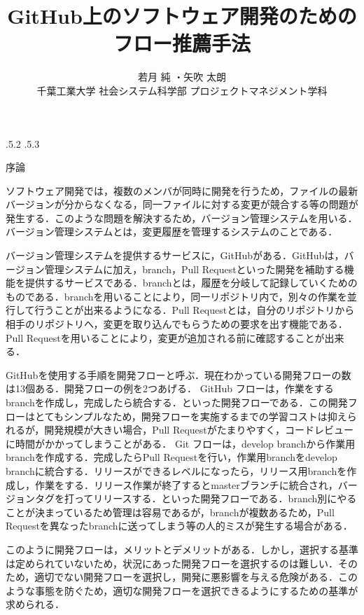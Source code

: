 \documentclass[uplatex,twocolumn]{jsarticle}
\title{\vspace{-14mm}GitHub上のソフトウェア開発のためのフロー推薦手法 \footnotemark[0]}
\author{若月 純 \footnotemark[2]・矢吹 太朗 \\ 千葉工業大学 社会システム科学部 プロジェクトマネジメント学科\footnotemark[2]}
\date{}%
\makeatletter
\renewcommand{\section}{%
    \if@slide\clearpage\fi
    \@startsection{section}{1}{\z@}%
    {\Cvs \@plus.5\Cdp \@minus.2\Cdp}%
    {.5\Cvs \@plus.3\Cdp}%
    {\normalfont\raggedright}}
\makeatother
\begin{document}
\twocolumn[
	\maketitle
]
\begingroup
\def\thefootnote{\fnsymbol{footnote}}
\endgroup

\section{序論}

ソフトウェア開発では，複数のメンバが同時に開発を行うため，ファイルの最新バージョンが分からなくなる，同一ファイルに対する変更が競合する等の問題が発生する．このような問題を解決するため，バージョン管理システムを用いる．バージョン管理システムとは，変更履歴を管理するシステムのことである\cite{ikeda2014}．

バージョン管理システムを提供するサービスに，GitHubがある．GitHubは，バージョン管理システムに加え，branch，Pull Requestといった開発を補助する機能を提供するサービスである．branchとは，履歴を分岐して記録していくためのものである．branchを用いることにより，同一リポジトリ内で，別々の作業を並行して行うことが出来るようになる．Pull Requestとは，自分のリポジトリから相手のリポジトリへ，変更を取り込んでもらうための要求を出す機能である．Pull Requestを用いることにより，変更が追加される前に確認することが出来る．

GitHubを使用する手順を開発フローと呼ぶ．現在わかっている開発フローの数は13個ある\cite{onodera2015}．開発フローの例を2つあげる．
GitHub フローは，作業をするbranchを作成し，完成したら統合する．といった開発フローである．この開発フローはとてもシンプルなため，開発フローを実施するまでの学習コストは抑えられるが，開発規模が大きい場合，Pull Requestがたまりやすく，コードレビューに時間がかかってしまうことがある．
Git フローは，develop branchから作業用branchを作成する．完成したらPull Requestを行い，作業用branchをdevelop branchに統合する．リリースができるレベルになったら，リリース用branchを作成し，作業をする．リリース作業が終了するとmasterブランチに統合され，バージョンタグを打ってリリースする．といった開発フローである．branch別にやることが決まっているため管理は容易であるが，branchが複数あるため，Pull Requestを異なったbranchに送ってしまう等の人的ミスが発生する場合がある\cite{ohtsuka2014}．

このように開発フローは，メリットとデメリットがある．しかし，選択する基準は定められていないため，状況にあった開発フローを選択するのは難しい．そのため，適切でない開発フローを選択し，開発に悪影響を与える危険がある．このような事態を防ぐため，適切な開発フローを選択できるようにするための基準が求められる．
\end{document}
